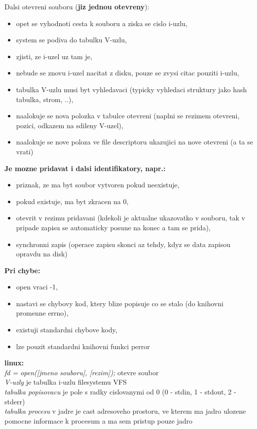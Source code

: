 \documentclass[a4paper, 11pt]{article}
\begin{document}
Dalsi otevreni souboru (\textbf{jiz jednou otevreny}):
\begin{itemize}
    \item opet se vyhodnoti cesta k souboru a ziska se cislo i-uzlu,
    \item system se podiva do tabulku V-uzlu,
    \item zjisti, ze i-uzel uz tam je,
    \item nebude se znovu i-uzel nacitat z disku, pouze se zvysi citac pouziti i-uzlu,
    \item tabulka V-uzlu musi byt vyhledavaci (typicky vyhledaci struktury jako hash tabulka, strom, ..),
    \item naalokuje se nova polozka v tabulce otevreni (naplni se rezimem otevreni, pozici, odkazem na sdileny V-uzel),
    \item naalokuje se nove poloza ve file descriptoru ukazujici na nove otevreni (a ta se vrati) \\
\end{itemize}

\newpage

\textbf{Je mozne pridavat i dalsi identifikatory, napr.:}
\begin{itemize}
    \item priznak, ze ma byt soubor vytvoren pokud neexistuje,
    \item pokud existuje, ma byt zkracen na 0,
    \item otevrit v rezimu pridavani (kdekoli je aktualne ukazovatko v souboru, tak v pripade zapisu se automaticky posune na konec a tam se prida),
    \item synchronni zapis (operace zapisu skonci az tehdy, kdyz se data zapisou opravdu na disk) \\
\end{itemize}

\textbf{Pri chybe:}
\begin{itemize}
    \item open vraci -1,
    \item nastavi se chybovy kod, ktery blize popisuje co se stalo (do knihovni promenne errno),
    \item existuji standardni chybove kody,
    \item lze pouzit standardni knihovni funkci perror \\
\end{itemize}

\textbf{linux:} \\[0.5em]
\textit{fd = open([jmeno souboru], [rezim]);} otevre soubor \\[0.2em]
\textit{V-uzly} je tabulka i-uzlu filesystemu VFS \\[0.2em]
\textit{tabulka popisovacu} je pole s radky cislovanymi od 0 (0 - stdin, 1 - stdout, 2 - stderr) \\[0.2em]
\textit{tabulka procesu} v jadre je cast adresoveho prostoru, ve kterem ma jadro ulozene pomocne informace k procesum a ma sem pristup pouze jadro \\[0.2em]
\end{document}
